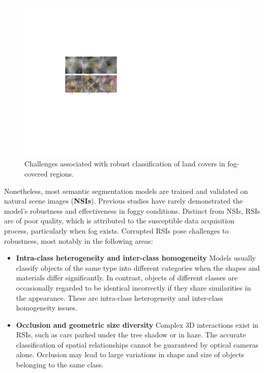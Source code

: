 \documentclass[lettersize,journal]{IEEEtran}
\begin{document}
\begin{figure}[!htbp]
    \centering
    \includegraphics[width=0.9\columnwidth]{challenges.pdf}
    \caption{Challenges associated with robust classification of land covers in fog-covered regions.}
    \label{challenges}
    \vspace{-0.2cm}
\end{figure}

Nonetheless, most semantic segmentation models are trained and validated on natural scene images (\textbf{NSIs}). Previous studies have rarely demonstrated the model's robustness and effectiveness in foggy conditions. Distinct from NSIs, RSIs are of poor quality, which is attributed to the susceptible data acquisition process, particularly when fog exists. Corrupted RSIs pose challenges to robustness, most notably in the following areas:
\begin{itemize}
    \item{\textbf{Intra-class heterogeneity and inter-class homogeneity} Models usually classify objects of the same type into different categories when the shapes and materials differ significantly. In contrast, objects of different classes are occasionally regarded to be identical incorrectly if they share similarities in the appearance. These are intra-class heterogeneity and inter-class homogeneity issues.}
\item{ \textbf{Occlusion and geometric size diversity} Complex 3D interactions exist in RSIs, such as cars parked under the tree shadow or in haze. The accurate classification of spatial relationships cannot be guaranteed by optical cameras alone. Occlusion may lead to large variations in shape and size of objects belonging to the same class. }
\end{itemize}
\end{document}
